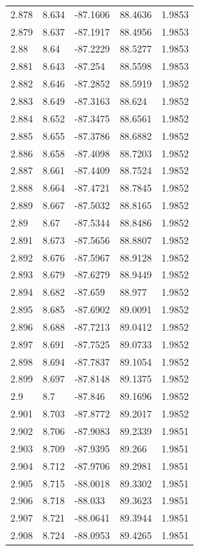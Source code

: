 \begin{tabular}{lllll}
2.878 & 8.634 & -87.1606 & 88.4636 & 1.9853 \\
2.879 & 8.637 & -87.1917 & 88.4956 & 1.9853 \\
2.88 & 8.64 & -87.2229 & 88.5277 & 1.9853 \\
2.881 & 8.643 & -87.254 & 88.5598 & 1.9853 \\
2.882 & 8.646 & -87.2852 & 88.5919 & 1.9852 \\
2.883 & 8.649 & -87.3163 & 88.624 & 1.9852 \\
2.884 & 8.652 & -87.3475 & 88.6561 & 1.9852 \\
2.885 & 8.655 & -87.3786 & 88.6882 & 1.9852 \\
2.886 & 8.658 & -87.4098 & 88.7203 & 1.9852 \\
2.887 & 8.661 & -87.4409 & 88.7524 & 1.9852 \\
2.888 & 8.664 & -87.4721 & 88.7845 & 1.9852 \\
2.889 & 8.667 & -87.5032 & 88.8165 & 1.9852 \\
2.89 & 8.67 & -87.5344 & 88.8486 & 1.9852 \\
2.891 & 8.673 & -87.5656 & 88.8807 & 1.9852 \\
2.892 & 8.676 & -87.5967 & 88.9128 & 1.9852 \\
2.893 & 8.679 & -87.6279 & 88.9449 & 1.9852 \\
2.894 & 8.682 & -87.659 & 88.977 & 1.9852 \\
2.895 & 8.685 & -87.6902 & 89.0091 & 1.9852 \\
2.896 & 8.688 & -87.7213 & 89.0412 & 1.9852 \\
2.897 & 8.691 & -87.7525 & 89.0733 & 1.9852 \\
2.898 & 8.694 & -87.7837 & 89.1054 & 1.9852 \\
2.899 & 8.697 & -87.8148 & 89.1375 & 1.9852 \\
2.9 & 8.7 & -87.846 & 89.1696 & 1.9852 \\
2.901 & 8.703 & -87.8772 & 89.2017 & 1.9852 \\
2.902 & 8.706 & -87.9083 & 89.2339 & 1.9851 \\
2.903 & 8.709 & -87.9395 & 89.266 & 1.9851 \\
2.904 & 8.712 & -87.9706 & 89.2981 & 1.9851 \\
2.905 & 8.715 & -88.0018 & 89.3302 & 1.9851 \\
2.906 & 8.718 & -88.033 & 89.3623 & 1.9851 \\
2.907 & 8.721 & -88.0641 & 89.3944 & 1.9851 \\
2.908 & 8.724 & -88.0953 & 89.4265 & 1.9851 \\

\end{tabular}
